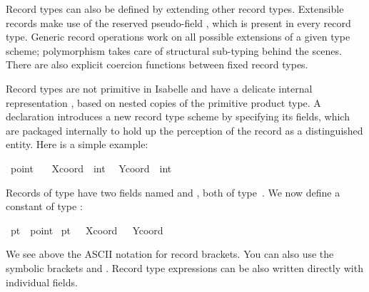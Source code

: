 \begin{isabellebody}
\begin{isamarkuptext}
  Record types can also be defined by extending other record types.
  Extensible records make use of the reserved pseudo-field ,
  which is present in every record type.  Generic record operations
  work on all possible extensions of a given type scheme; polymorphism
  takes care of structural sub-typing behind the scenes.  There are
  also explicit coercion functions between fixed record types.%
\end{isamarkuptext}%
\isamarkuptrue%
%
\isamarkuptrue%
%
\begin{isamarkuptext}%
Record types are not primitive in Isabelle and have a delicate
  internal representation \cite{NaraschewskiW-TPHOLs98}, based on
  nested copies of the primitive product type.  A 
  declaration introduces a new record type scheme by specifying its
  fields, which are packaged internally to hold up the perception of
  the record as a distinguished entity.  Here is a simple example:%
\end{isamarkuptext}%
\isamarkuptrue%
\isamarkupfalse%
\ point\ {}\isanewline
\ \ Xcoord\ {}{}\ int\isanewline
\ \ Ycoord\ {}{}\ int%
\begin{isamarkuptext}%
\noindent
  Records of type  have two fields named 
  and , both of type~.  We now define a
  constant of type :%
\end{isamarkuptext}%
\isamarkuptrue%
\isamarkupfalse%
\ pt{}\ {}{}\ point\ \isanewline
{}pt{}\ {}\ {}{}\ Xcoord\ {}\ {}{}{}{}\ Ycoord\ {}\ {}{}\ {}{}{}%
\begin{isamarkuptext}%
\noindent
  We see above the ASCII notation for record brackets.  You can also
  use the symbolic brackets  and .  Record type
  expressions can be also written directly with individual fields.

\end{isamarkuptext}
\end{isabellebody}
